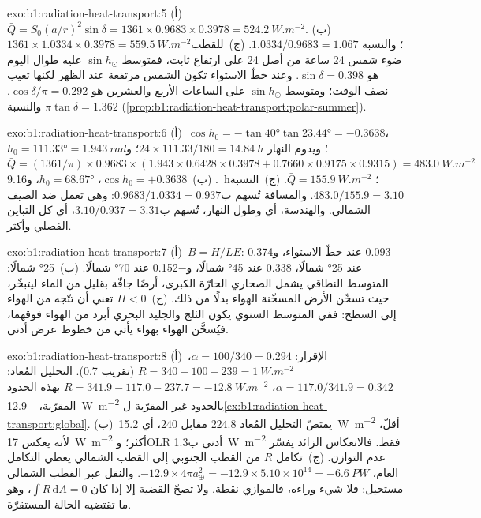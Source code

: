 \begin{solution}{exo:b1:radiation-heat-transport:5}
(أ)~$\bar Q = S_0(a/r)^2\sin\delta = 1361 \times 0.9683 \times 0.3978 =
\qty{524.2}{W.m^{-2}}$. (ب)~$1361 \times 1.0334 \times 0.3978 =
\qty{559.5}{W.m^{-2}}$؛ والنسبة $1.0334/0.9683 = 1.067$. (ج)~للقطب ضوء شمس \num{24} ساعة من أصل \num{24} على ارتفاع ثابت، فمتوسط $\sin h_\odot$ عليه طوال اليوم هو $\sin\delta = 0.398$. وعند خطّ الاستواء تكون الشمس مرتفعة عند الظهر لكنها تغيب نصف الوقت؛ ومتوسط $\sin h_\odot$ على الساعات الأربع والعشرين هو $\cos\delta/\pi =
0.292$. والنسبة $\pi\tan\delta = 1.362$
(\cref{prop:b1:radiation-heat-transport:polar-summer}).
\end{solution}

\begin{solution}{exo:b1:radiation-heat-transport:6}
(أ)~$\cos h_0 = -\tan\ang{40}\tan\ang{23.44} = -0.3638$، $h_0 = \ang{111.33} =
\qty{1.943}{rad}$؛ ويدوم النهار $24 \times 111.33/180 = \qty{14.84}{h}$؛ و$\bar Q =
(1361/\pi) \times 0.9683 \times (1.943 \times 0.6428 \times 0.3978 + 0.7660 \times
0.9175 \times 0.9315) = \qty{483.0}{W.m^{-2}}$. (ب)~$\cos h_0 = +0.3638$، $h_0 =
\ang{68.67}$، و\qty{9.16}{h}؛ $\bar Q = \qty{155.9}{W.m^{-2}}$. (ج)~النسبة
$483.0/155.9 = 3.10$. والمسافة تُسهم ب$0.9683/1.0334 = 0.937$: وهي تعمل ضد الصيف الشمالي. والهندسة، أي  وطول النهار، تُسهم ب$3.10/0.937 = 3.31$، أي كل التباين الفصلي وأكثر.
\end{solution}

\begin{solution}{exo:b1:radiation-heat-transport:7}
(أ)~$B = H/LE$: \num{0.093} عند خطّ الاستواء، و\num{0.374} عند \ang{25} شمالًا،
\num{0.338} عند \ang{45} شمالًا، و\num{-0.152} عند \ang{70} شمالًا. (ب)~\ang{25} شمالًا: المتوسط النطاقي يشمل الصحاري الحارّة الكبرى، أرضًا جافّة بقليل من الماء ليتبخّر، حيث تسخّن الأرض المسخّنة الهواء بدلًا من ذلك. (ج)~$H < 0$ تعني أن  تتّجه من الهواء إلى السطح: ففي المتوسط السنوي يكون الثلج والجليد البحري أبرد من الهواء فوقهما، فيُسخَّن الهواء بهواء يأتي من خطوط عرض أدنى.
\end{solution}

\begin{solution}{exo:b1:radiation-heat-transport:8}
(أ)~الإقرار: $\alpha = 100/340 = 0.294$، $R = 340 - 100 - 239 =
\qty{+1}{W.m^{-2}}$ (تقريب \num{0.7}). التحليل المُعاد: $\alpha = 117.0/341.9 =
0.342$، $R = 341.9 - 117.0 - 237.7 = \qty{-12.8}{W.m^{-2}}$ بهذه الحدود المقرّبة،
\qty{-12.9}{W.m^{-2}} بالحدود غير المقرّبة ل\cref{ex:b1:radiation-heat-transport:global}. (ب)~يمتصّ التحليل المُعاد $224.8$ مقابل $240$، أي \qty{15.2}{W.m^{-2}} أقلّ، لأنه يعكس \qty{17}{W.m^{-2}} أكثر؛ وOLR أدنى ب\qty{1.3}{W.m^{-2}} فقط. فالانعكاس الزائد يفسّر عدم التوازن. (ج)~تكامل $R$ من القطب الجنوبي إلى القطب الشمالي يعطي التكامل العام، $-12.9 \times 4\pi a_\oplus^2 = -12.9 \times
5.10\times10^{14} = \qty{-6.6}{PW}$. والنقل عبر القطب الشمالي مستحيل: فلا شيء وراءه، فالموازي نقطة. ولا تصحّ القضية إلا إذا كان $\int R\,\mathrm dA = 0$، وهو ما تقتضيه الحالة المستقرّة.
\end{solution}

